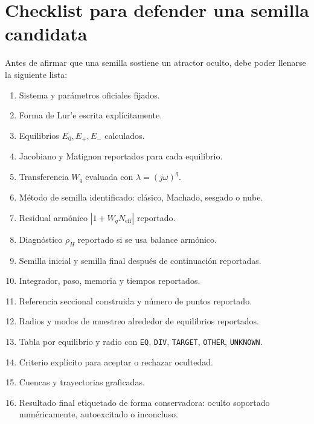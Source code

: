 \documentclass[11pt]{article}
\begin{document}
\section{Checklist para defender una semilla candidata}

Antes de afirmar que una semilla sostiene un atractor oculto, debe poder llenarse la siguiente lista:
\begin{enumerate}[label=\arabic*.]
\item Sistema y parámetros oficiales fijados.
\item Forma de Lur'e escrita explícitamente.
\item Equilibrios \(E_0,E_+,E_-\) calculados.
\item Jacobiano y Matignon reportados para cada equilibrio.
\item Transferencia \(W_q\) evaluada con \(\lambda=(j\omega)^q\).
\item Método de semilla identificado: clásico, Machado, sesgado o nube.
\item Residual armónico \(|1+W_qN_{\mathrm{eff}}|\) reportado.
\item Diagnóstico \(\rho_H\) reportado si se usa balance armónico.
\item Semilla inicial y semilla final después de continuación reportadas.
\item Integrador, paso, memoria y tiempos reportados.
\item Referencia seccional construida y número de puntos reportado.
\item Radios y modos de muestreo alrededor de equilibrios reportados.
\item Tabla por equilibrio y radio con \texttt{EQ}, \texttt{DIV}, \texttt{TARGET}, \texttt{OTHER}, \texttt{UNKNOWN}.
\item Criterio explícito para aceptar o rechazar ocultedad.
\item Cuencas y trayectorias graficadas.
\item Resultado final etiquetado de forma conservadora: oculto soportado numéricamente, autoexcitado o inconcluso.
\end{enumerate}
\end{document}
